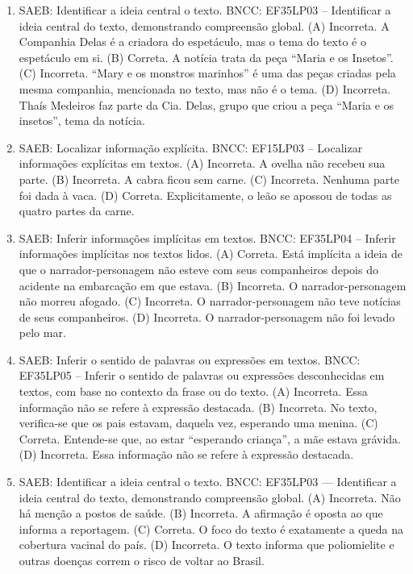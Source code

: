 \begin{enumerate}
\item
SAEB: Identificar a ideia central o texto.
BNCC: EF35LP03 -- Identificar a ideia central do texto, demonstrando
compreensão global.
(A) Incorreta. A Companhia Delas é a criadora do espetáculo, mas o tema do texto é o espetáculo em si.
(B) Correta. A notícia trata da peça ``Maria e os Insetos''.
(C) Incorreta. ``Mary e os monstros marinhos'' é uma das peças criadas
pela mesma companhia, mencionada no texto, mas não é o tema.
(D) Incorreta. Thaís Medeiros faz parte da Cia. Delas, grupo que criou a
peça ``Maria e os insetos'', tema da notícia.

\item
SAEB: Localizar informação explícita.
BNCC: EF15LP03 -- Localizar informações explícitas em textos.
(A) Incorreta. A ovelha não recebeu sua parte.
(B) Incorreta. A cabra ficou sem carne.
(C) Incorreta. Nenhuma parte foi dada à vaca.
(D) Correta. Explicitamente, o leão se apossou de todas as quatro partes da carne.

\item
SAEB: Inferir informações implícitas em textos.
BNCC: EF35LP04 -- Inferir informações implícitas nos textos lidos.
(A) Correta. Está implícita a ideia de que o narrador-personagem não esteve com seus companheiros depois do acidente na embarcação em que estava.
(B) Incorreta. O narrador-personagem não morreu afogado.
(C) Incorreta. O narrador-personagem não teve notícias de seus companheiros.
(D) Incorreta. O narrador-personagem não foi levado pelo mar.

\item
SAEB: Inferir o sentido de palavras ou expressões em textos.
BNCC: EF35LP05 -- Inferir o sentido de palavras ou expressões
desconhecidas em textos, com base no contexto da frase ou do texto.
(A) Incorreta. Essa informação não se refere à expressão destacada.
(B) Incorreta. No texto, verifica-se que os pais estavam, daquela vez,
esperando uma menina.
(C) Correta. Entende-se que, ao estar ``esperando criança'', a mãe estava
grávida.
(D) Incorreta. Essa informação não se refere à expressão destacada.

\item
SAEB: Identificar a ideia central o texto. 
BNCC: EF35LP03 --- Identificar a ideia central do texto, demonstrando compreensão global.
(A) Incorreta. Não há menção a postos de saúde. 
(B) Incorreta. A afirmação é oposta ao que informa a reportagem. 
(C) Correta. O foco do texto é exatamente a queda na cobertura vacinal do país. 
(D) Incorreta. O texto informa que poliomielite e outras doenças correm o risco de voltar ao Brasil.


\end{enumerate}
